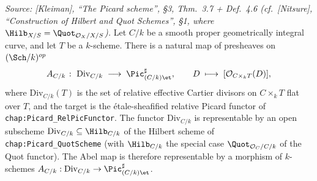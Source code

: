 \begin{lemma}
  \label{lem:line_bundle_quot_correspondence}
  \textit{Source: [Kleiman], ``The Picard scheme'', \S 3,
  Thm.~3.7 + Def.~4.6 (cf.\ [Nitsure], ``Construction of Hilbert
  and Quot Schemes'', \S 1, where \(\Hilb_{X/S} = \Quot_{\mathcal{O}_X/X/S}\)).}
  Let \(C/k\) be a smooth proper geometrically integral curve, and let
  \(T\) be a \(k\)-scheme. There is a natural map of presheaves on \((\Sch/k)^{op}\)
  \[
    A_{C/k} \;\colon\; \mathrm{Div}_{C/k} \;\longrightarrow\; \Pic^\sharp_{(C/k)\et},
    \qquad D \;\longmapsto\; [\mathcal{O}_{C \times_k T}(D)],
  \]
  where \(\mathrm{Div}_{C/k}(T)\) is the set of relative effective Cartier divisors
  on \(C \times_k T\) flat over \(T\), and the target is the
  \'etale-sheafified relative Picard functor of
  \texttt{chap:Picard\_RelPicFunctor}. The functor \(\mathrm{Div}_{C/k}\) is representable
  by an open subscheme \(\mathrm{Div}_{C/k} \subseteq \Hilb_{C/k}\) of the Hilbert scheme
  of \texttt{chap:Picard\_QuotScheme} (with \(\Hilb_{C/k}\) the special case
  \(\Quot_{\mathcal{O}_C/C/k}\) of the Quot functor). The Abel map is therefore
  representable by a morphism of \(k\)-schemes \(A_{C/k} : \mathrm{Div}_{C/k} \to
  \Pic^\sharp_{(C/k)\et}\).
\end{lemma}

